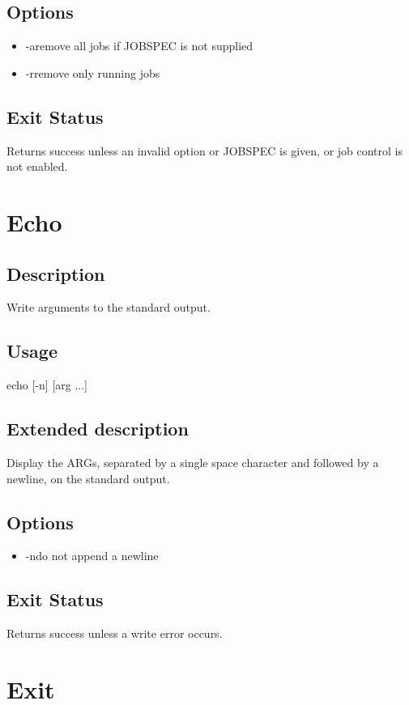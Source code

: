 \documentclass[12pt,a4paper]{report}
\begin{document}
\section{Options}
\begin{itemize}
	\item -a\hspace{7 mm}remove all jobs if JOBSPEC is not supplied
	\item -r\hspace{7 mm}remove only running jobs
\end{itemize}
\section{Exit Status}
Returns success unless an invalid option or JOBSPEC is given, or job control is not enabled.
\newpage

\chapter{Echo}
\section{Description}
Write arguments to the standard output.
\section{Usage}
echo [-n] [arg ...]
\section{Extended description}
Display the ARGs, separated by a single space character and followed by a newline, on the standard output.
\section{Options}
\begin{itemize}
	\item -n\hspace{7 mm}do not append a newline
\end{itemize}
\section{Exit Status}
Returns success unless a write error occurs.
\newpage

\chapter{Exit}
\end{document}

